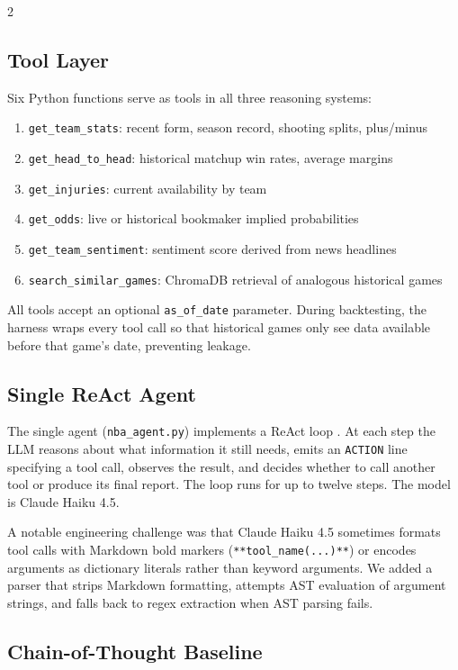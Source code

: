 \documentclass[11pt]{article}
\begin{document}
\begin{multicols}{2}
\subsection{Tool Layer}

Six Python functions serve as tools in all three reasoning systems:

\begin{enumerate}[leftmargin=*]
    \item \texttt{get\_team\_stats}: recent form, season record, shooting splits, plus/minus
    \item \texttt{get\_head\_to\_head}: historical matchup win rates, average margins
    \item \texttt{get\_injuries}: current availability by team
    \item \texttt{get\_odds}: live or historical bookmaker implied probabilities
    \item \texttt{get\_team\_sentiment}: sentiment score derived from news headlines
    \item \texttt{search\_similar\_games}: ChromaDB retrieval of analogous historical games
\end{enumerate}

All tools accept an optional \texttt{as\_of\_date} parameter. During backtesting, the harness wraps every tool call so that historical games only see data available before that game's date, preventing leakage.

\subsection{Single ReAct Agent}

The single agent (\texttt{nba\_agent.py}) implements a ReAct loop \citep{yao2023}. At each step the LLM reasons about what information it still needs, emits an \texttt{ACTION} line specifying a tool call, observes the result, and decides whether to call another tool or produce its final report. The loop runs for up to twelve steps. The model is Claude Haiku 4.5.

A notable engineering challenge was that Claude Haiku 4.5 sometimes formats tool calls with Markdown bold markers (\texttt{**tool\_name(...)**}) or encodes arguments as dictionary literals rather than keyword arguments. We added a parser that strips Markdown formatting, attempts AST evaluation of argument strings, and falls back to regex extraction when AST parsing fails.

\subsection{Chain-of-Thought Baseline}


\end{multicols}
\end{document}
